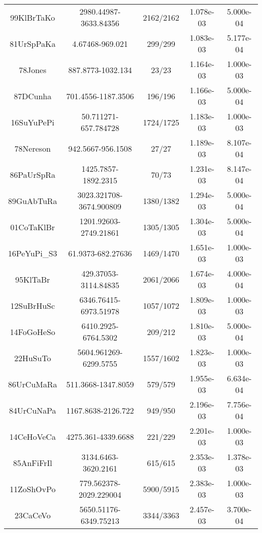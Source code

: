 \begin{longtable}{c c c c c}
99KlBrTaKo \cite{99KlBrTaKo.NH3} & 2980.44987-3633.84356 & 2162/2162 & 1.078e-03 & 5.000e-04 \\
81UrSpPaKa \cite{81UrSpPaKa.NH3} & 4.67468-969.021 & 299/299 & 1.083e-03 & 5.177e-04 \\
78Jones \cite{78Jones.NH3} & 887.8773-1032.134 & 23/23 & 1.164e-03 & 1.000e-03 \\
87DCunha \cite{87DCunha.NH3} & 701.4556-1187.3506 & 196/196 & 1.166e-03 & 5.000e-04 \\
16SuYuPePi \cite{16SuYuPePi.NH3} & 50.711271-657.784728 & 1724/1725 & 1.183e-03 & 1.000e-03 \\
78Nereson \cite{78Nereson.NH3} & 942.5667-956.1508 & 27/27 & 1.189e-03 & 8.107e-04 \\
86PaUrSpRa \cite{86PaUrSpRa.NH3} & 1425.7857-1892.2315 & 70/73 & 1.231e-03 & 8.147e-04 \\
89GuAbTuRa \cite{89GuAbTuRa.NH3} & 3023.321708-3674.900809 & 1380/1382 & 1.294e-03 & 5.000e-04 \\
01CoTaKlBr \cite{01CoTaKlBr.NH3} & 1201.92603-2749.21861 & 1305/1305 & 1.304e-03 & 5.000e-04 \\
16PeYuPi_S3 \cite{16PeYuPi_S3.NH3} & 61.9373-682.27636 & 1469/1470 & 1.651e-03 & 1.000e-03 \\
95KlTaBr \cite{95KlTaBr.NH3} & 429.37053-3114.84835 & 2061/2066 & 1.674e-03 & 4.000e-04 \\
12SuBrHuSc \cite{12SuBrHuSc.NH3} & 6346.76415-6973.51978 & 1057/1072 & 1.809e-03 & 1.000e-03 \\
14FoGoHeSo \cite{14FoGoHeSo.NH3} & 6410.2925-6764.5302 & 209/212 & 1.810e-03 & 5.000e-04 \\
22HuSuTo \cite{22HuSuTo.NH3} & 5604.961269-6299.5755 & 1557/1602 & 1.823e-03 & 1.000e-03 \\
86UrCuMaRa \cite{86UrCuMaRa.NH3} & 511.3668-1347.8059 & 579/579 & 1.955e-03 & 6.634e-04 \\
84UrCuNaPa \cite{84UrCuNaPa.NH3} & 1167.8638-2126.722 & 949/950 & 2.196e-03 & 7.756e-04 \\
14CeHoVeCa \cite{14CeHoVeCa.NH3} & 4275.361-4339.6688 & 221/229 & 2.201e-03 & 1.000e-03 \\
85AnFiFrIl \cite{85AnFiFrIl.NH3} & 3134.6463-3620.2161 & 615/615 & 2.353e-03 & 1.378e-03 \\
11ZoShOvPo \cite{11ZoShOvPo.NH3} & 779.562378-2029.229004 & 5900/5915 & 2.383e-03 & 1.000e-03 \\
23CaCeVo \cite{23CaCeVo.NH3} & 5650.51176-6349.75213 & 3344/3363 & 2.457e-03 & 3.700e-04 \\

\end{longtable}

